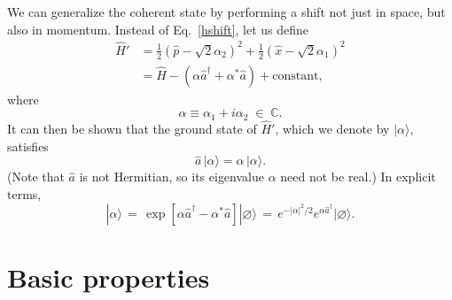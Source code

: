 \documentclass[pra,12pt]{revtex4}
\begin{document}
We can generalize the coherent state by performing a shift not just in
space, but also in momentum.  Instead of Eq.~\eqref{hshift}, let us
define
\begin{align}
  \hat{H}' &= \frac{1}{2}\left(\hat{p} - \sqrt{2}\alpha_2\right)^2
  + \frac{1}{2}\left(\hat{x} - \sqrt{2}\alpha_1\right)^2 \\
  &= \hat{H} - \left(\alpha \hat{a}^\dagger + \alpha^*\hat{a}\right)
  + \textrm{constant},
\end{align}
where
\begin{equation}
  \alpha \equiv \alpha_1 + i \alpha_2 \;\in \;\mathbb{C}.
\end{equation}
It can then be shown that the ground state of $\hat{H}'$, which we
denote by $|\alpha\rangle$, satisfies
\begin{equation}
  \hat{a} \, |\alpha\rangle = \alpha \,|\alpha\rangle.
  \label{aaction}
\end{equation}
(Note that $\hat{a}$ is not Hermitian, so its eigenvalue $\alpha$ need
not be real.)  In explicit terms,
\begin{equation}
  |\alpha\rangle
  \,=\, \exp\left[\alpha\hat{a}^\dagger - \alpha^*\hat{a}\right] |\varnothing\rangle
  \,=\, e^{-|\alpha|^2/2} e^{\alpha\hat{a}^\dagger} |\varnothing\rangle.
  \label{alphaexp}
\end{equation}

\section{Basic properties}
\end{document}
